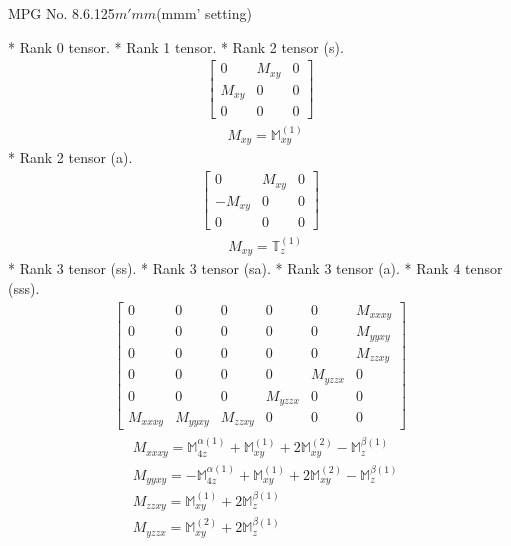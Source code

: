 \documentclass[fleqn,8pt,landscape]{jsarticle}
\begin{document}
\setcounter{MaxMatrixCols}{32}

\renewcommand{\tablename}{Table~}
\renewcommand{\figurename}{Figure~}
\begin{center}
\LARGE
MPG No. 8.6.125\quad$m'mm$\quad(mmm' setting)
\end{center}
* Rank 0 tensor.
* Rank 1 tensor.
* Rank 2 tensor (s).
\begin{align*}
\begin{bmatrix} 0 & M_{xy} & 0 \\ M_{xy} & 0 & 0 \\ 0 & 0 & 0 \end{bmatrix}
\end{align*}
\begin{align*}
& M_{xy} = \mathbb{M}_{xy}^{(1)}
\end{align*}
* Rank 2 tensor (a).
\begin{align*}
\begin{bmatrix} 0 & M_{xy} & 0 \\ - M_{xy} & 0 & 0 \\ 0 & 0 & 0 \end{bmatrix}
\end{align*}
\begin{align*}
& M_{xy} = \mathbb{T}_{z}^{(1)}
\end{align*}
* Rank 3 tensor (ss).
* Rank 3 tensor (sa).
* Rank 3 tensor (a).
* Rank 4 tensor (sss).
\begin{align*}
\begin{bmatrix} 0 & 0 & 0 & 0 & 0 & M_{xxxy} \\ 0 & 0 & 0 & 0 & 0 & M_{yyxy} \\ 0 & 0 & 0 & 0 & 0 & M_{zzxy} \\ 0 & 0 & 0 & 0 & M_{yzzx} & 0 \\ 0 & 0 & 0 & M_{yzzx} & 0 & 0 \\ M_{xxxy} & M_{yyxy} & M_{zzxy} & 0 & 0 & 0 \end{bmatrix}
\end{align*}
\begin{align*}
& M_{xxxy} = \mathbb{M}_{4z}^{\alpha(1)} + \mathbb{M}_{xy}^{(1)} + 2 \mathbb{M}_{xy}^{(2)} - \mathbb{M}_{z}^{\beta(1)} \\
& M_{yyxy} = - \mathbb{M}_{4z}^{\alpha(1)} + \mathbb{M}_{xy}^{(1)} + 2 \mathbb{M}_{xy}^{(2)} - \mathbb{M}_{z}^{\beta(1)} \\
& M_{zzxy} = \mathbb{M}_{xy}^{(1)} + 2 \mathbb{M}_{z}^{\beta(1)} \\
& M_{yzzx} = \mathbb{M}_{xy}^{(2)} + 2 \mathbb{M}_{z}^{\beta(1)}
\end{align*}
\end{document}
